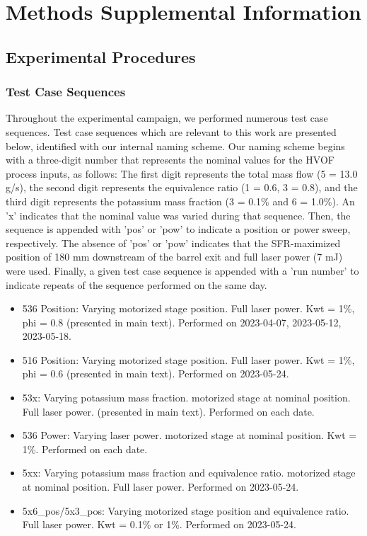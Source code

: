 \section{Methods Supplemental Information}


\subsection{Experimental Procedures}

\subsubsection{Test Case Sequences}



Throughout the experimental campaign, we performed numerous test case sequences. Test case sequences which are relevant to this work are presented below, identified with our internal naming scheme. Our naming scheme begins with a three-digit number that represents the nominal values for the HVOF process inputs, as follows: The first digit represents the total mass flow (5 = 13.0 g/s), the second digit represents the equivalence ratio (1 = 0.6, 3 = 0.8), and the third digit represents the potassium mass fraction (3 = 0.1\% and 6 = 1.0\%). An 'x' indicates that the nominal value was varied during that sequence. Then, the sequence is appended with 'pos' or 'pow' to indicate a position or power sweep, respectively. The absence of 'pos' or 'pow' indicates that the SFR-maximized position of 180 mm downstream of the barrel exit and full laser power (7 mJ) were used. Finally, a given test case sequence is appended with a 'run number' to indicate repeats of the sequence performed on the same day. 


\begin{itemize}
    \item 536 Position: Varying motorized stage position. Full laser power. Kwt = 1\%, phi = 0.8 (presented in main text). Performed on 2023-04-07, 2023-05-12, 2023-05-18.
    \item 516 Position: Varying motorized stage position. Full laser power. Kwt = 1\%, phi = 0.6 (presented in main text). Performed on 2023-05-24.
    \item 53x: Varying potassium mass fraction. motorized stage at nominal position. Full laser power. (presented in main text). Performed on each date. 
    \item 536 Power: Varying laser power. motorized stage at nominal position. Kwt = 1\%. Performed on each date. 
    \item 5xx: Varying potassium mass fraction and equivalence ratio. motorized stage at nominal position. Full laser power. Performed on 2023-05-24.
    \item 5x6\_pos/5x3\_pos: Varying motorized stage position and equivalence ratio. Full laser power. Kwt = 0.1\% or 1\%. Performed on 2023-05-24.
\end{itemize}

